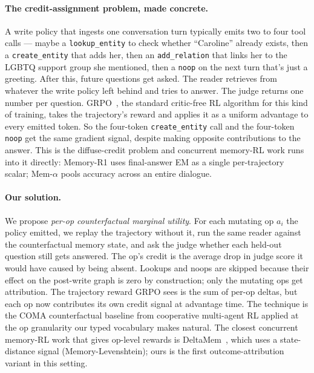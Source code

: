 \documentclass[11pt]{article}
\begin{document}
\paragraph{The credit-assignment problem, made concrete.} A write
policy that ingests one conversation turn typically emits two to four
tool calls --- maybe a \texttt{lookup\_entity} to check whether
``Caroline'' already exists, then a \texttt{create\_entity} that adds
her, then an \texttt{add\_relation} that links her to the LGBTQ support
group she mentioned, then a \texttt{noop} on the next turn that's just
a greeting. After this, future questions get asked. The reader
retrieves from whatever the write policy left behind and tries to
answer. The judge returns one number per question. GRPO~\cite{shao2024deepseekmath},
the standard critic-free RL algorithm for this kind of training, takes
the trajectory's reward and applies it as a uniform advantage to every
emitted token. So the four-token \texttt{create\_entity} call and the
four-token \texttt{noop} get the same gradient signal, despite making
opposite contributions to the answer. This is the diffuse-credit
problem and concurrent memory-RL work runs into it directly: Memory-R1
uses final-answer EM as a single per-trajectory scalar; Mem-$\alpha$
pools accuracy across an entire dialogue.

\paragraph{Our solution.} We propose \emph{per-op counterfactual
marginal utility}. For each mutating op $a_i$ the policy emitted, we
replay the trajectory without it, run the same reader against the
counterfactual memory state, and ask the judge whether each held-out
question still gets answered. The op's credit is the average drop in
judge score it would have caused by being absent. Lookups and noops
are skipped because their effect on the post-write graph is zero by
construction; only the mutating ops get attribution. The trajectory
reward GRPO sees is the sum of per-op deltas, but each op now
contributes its own credit signal at advantage time. The technique is
the COMA counterfactual baseline from cooperative multi-agent RL
\cite{foerster2018coma} applied at the op granularity our typed
vocabulary makes natural. The closest concurrent memory-RL work that
gives op-level rewards is DeltaMem~\cite{deltamem2026}, which uses a
state-distance signal (Memory-Levenshtein); ours is the first
outcome-attribution variant in this setting.
\end{document}
